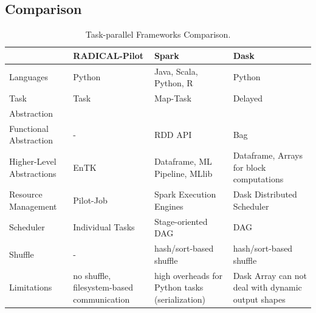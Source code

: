 
\subsection{Comparison}
\begin{table}[t]
    \scriptsize
    \centering
    \begin{tabular}{@{}p{2.75cm}|p{3.25cm}p{3.25cm}p{3.25cm}@{}}
        \toprule
        &\textbf{RADICAL-Pilot} &
        \textbf{Spark} &
        \textbf{Dask} \\
        \midrule
        Languages &
        Python &
        Java, Scala, Python, R &
        Python\\
        Task &
        Task &
        Map-Task &
        Delayed\\
        Abstraction &
        &
        & \\
        Functional Abstraction  &
        - &
        RDD API &
        Bag\\
        Higher-Level Abstractions &
        EnTK~\cite{balasubramanian2018harnessing} &
        Dataframe, ML Pipeline, MLlib~\cite{meng2016mllib} &
        Dataframe, Arrays for block computations\\
        Resource Management &
        Pilot-Job &
        Spark Execution Engines &
        Dask Distributed Scheduler\\
        Scheduler    &
        Individual Tasks &
        Stage-oriented DAG &
        DAG\\
        Shuffle      &
        -       &
        hash/sort-based shuffle &
        hash/sort-based shuffle\\
        Limitations &
        no shuffle, filesystem-based communication  &
        high overheads for Python tasks (serialization)   &
        Dask Array can not deal with dynamic output shapes\\
        \bottomrule
    \end{tabular}
    \caption{Task-parallel Frameworks Comparison.\label{tab:frameworks}}
\end{table}

